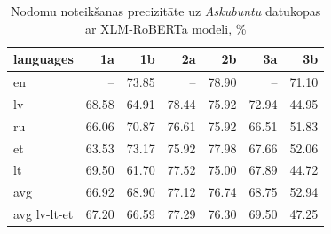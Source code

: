 \begin{table}[htbp]
  \centering
  \caption{Nodomu noteikšanas precizitāte uz \textit{Askubuntu} datukopas ar XLM-RoBERTa modeli, \%}
    \begin{tabular}{lrrrrrr}\toprule
    languages & 1a & 1b & 2a & 2b & 3a & 3b \\\midrule
    en    &   --    & \cellcolor[rgb]{ .694,  .784,  .898}73.85 &   --    & \cellcolor[rgb]{ .353,  .541,  .776}78.90 &   --    & \cellcolor[rgb]{ .882,  .914,  .965}71.10 \\
    lv    & \cellcolor[rgb]{ .984,  .965,  .976}68.58 & \cellcolor[rgb]{ .984,  .878,  .89}64.91 & \cellcolor[rgb]{ .384,  .565,  .788}78.44 & \cellcolor[rgb]{ .557,  .686,  .851}75.92 & \cellcolor[rgb]{ .757,  .827,  .922}72.94 & \cellcolor[rgb]{ .973,  .416,  .424}44.95 \\
    ru    & \cellcolor[rgb]{ .984,  .906,  .918}66.06 & \cellcolor[rgb]{ .898,  .925,  .969}70.87 & \cellcolor[rgb]{ .51,  .651,  .831}76.61 & \cellcolor[rgb]{ .557,  .686,  .851}75.92 & \cellcolor[rgb]{ .984,  .918,  .929}66.51 & \cellcolor[rgb]{ .976,  .576,  .584}51.83 \\
    et    & \cellcolor[rgb]{ .984,  .847,  .859}63.53 & \cellcolor[rgb]{ .741,  .816,  .914}73.17 & \cellcolor[rgb]{ .557,  .686,  .851}75.92 & \cellcolor[rgb]{ .416,  .588,  .8}77.98 & \cellcolor[rgb]{ .984,  .945,  .957}67.66 & \cellcolor[rgb]{ .976,  .58,  .588}52.06 \\
    lt    & \cellcolor[rgb]{ .988,  .988,  1}69.50 & \cellcolor[rgb]{ .98,  .804,  .816}61.70 & \cellcolor[rgb]{ .447,  .608,  .812}77.52 & \cellcolor[rgb]{ .62,  .729,  .871}75.00 & \cellcolor[rgb]{ .984,  .949,  .961}67.89 & \cellcolor[rgb]{ .973,  .412,  .42}44.72 \\\midrule
    avg   & \cellcolor[rgb]{ .984,  .925,  .937}66.92 & \cellcolor[rgb]{ .984,  .973,  .984}68.90 & \cellcolor[rgb]{ .475,  .627,  .82}77.12 & \cellcolor[rgb]{ .502,  .647,  .831}76.74 & \cellcolor[rgb]{ .984,  .969,  .98}68.75 & \cellcolor[rgb]{ .976,  .6,  .612}52.94 \\
    avg lv-lt-et & \cellcolor[rgb]{ .984,  .933,  .945}67.20 & \cellcolor[rgb]{ .984,  .918,  .929}66.59 & \cellcolor[rgb]{ .463,  .62,  .816}77.29 & \cellcolor[rgb]{ .529,  .667,  .839}76.30 & \cellcolor[rgb]{ .988,  .988,  1}69.50 & \cellcolor[rgb]{ .973,  .467,  .478}47.25 \\\bottomrule
    \end{tabular}%
  \label{tab:askubuntu-xlm}%
\end{table}%


